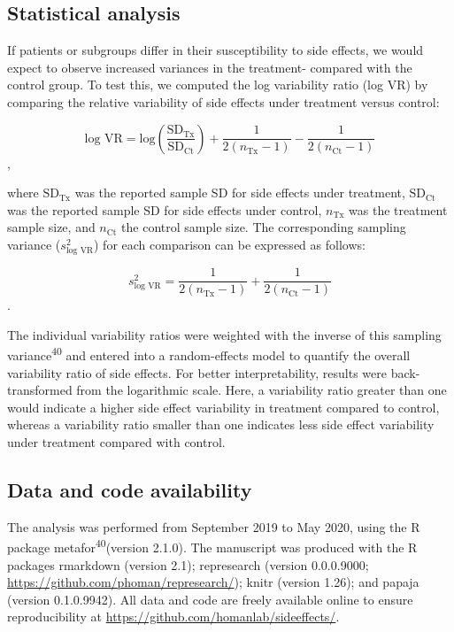 \documentclass[9pt,english,,jou,floatsintext]{apa6}
\begin{document}
\subsection{Statistical analysis}\label{statistical-analysis}

If patients or subgroups differ in their susceptibility to side effects,
we would expect to observe increased variances in the treatment-
compared with the control group. To test this, we computed the log
variability ratio (log VR) by comparing the relative variability of side
effects under treatment versus control:

\[\textrm{log VR}=\textrm{log}\left(\frac{\textrm{SD}_{\textrm{Tx}}}{\textrm{SD}_{\textrm{Ct}}} \right) +
\frac{1}{2(n_{\textrm{Tx}}-1)} - \frac{1}{2(n_{\textrm{Ct}}-1)} \],

where \(\textrm{SD}_{\textrm{Tx}}\) was the reported sample SD for side
effects under treatment, \(\textrm{SD}_{\textrm{Ct}}\) was the reported
sample SD for side effects under control, \(n_{\textrm{Tx}}\) was the
treatment sample size, and \(n_{\textrm{Ct}}\) the control sample size.
The corresponding sampling variance (\(s_{\textrm{log VR}}^2\)) for each
comparison can be expressed as follows:

\[ s_{\textrm{log VR}}^2 = \frac{1}{2(n_{\textrm{Tx}}-1)} + \frac{1}{2(n_{\textrm{Ct}}-1)}\].

The individual variability ratios were weighted with the inverse of this
sampling variance\textsuperscript{40} and entered into a random-effects
model to quantify the overall variability ratio of side effects. For
better interpretability, results were back-transformed from the
logarithmic scale. Here, a variability ratio greater than one would
indicate a higher side effect variability in treatment compared to
control, whereas a variability ratio smaller than one indicates less
side effect variability under treatment compared with control.

\subsection{Data and code
availability}\label{data-and-code-availability}

The analysis was performed from September 2019 to May 2020, using the R
package metafor\textsuperscript{40}(version 2.1.0). The manuscript was
produced with the R packages rmarkdown (version 2.1); represearch
(version 0.0.0.9000; \url{https://github.com/phoman/represearch/});
knitr (version 1.26); and papaja (version 0.1.0.9942). All data and code
are freely available online to ensure reproducibility at
\url{https://github.com/homanlab/sideeffects/}.
\end{document}
